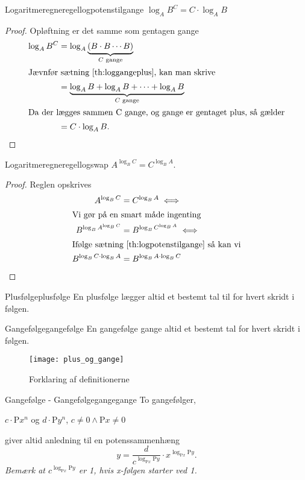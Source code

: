 \documentclass{article}
\newcommand{\Rho}{\mathrm{P}}
\begin{document}
\begin{theorem}{Logaritmeregneregel}{logpotenstilgange}
	$\log_AB^C = C \cdot \log_AB$
\end{theorem}

\begin{proof}
Opløftning er det samme som gentagen gange
\begin{align*}
	\log_AB^C &= \log_A{\underbrace{(B \cdot B \cdots B)}_{C\text{ gange}}}\\
\intertext{Jævnfør sætning \ref{th:loggangeplus}, kan man skrive}
			  &= \underbrace{\log_A{B} + \log_A{B} + \cdots + \log_A{B}}_{C\text{ gange}}\\
\intertext{Da der lægges sammen C gange, og gange er gentaget plus, så gælder}
			  &= C \cdot \log_AB.\qedhere
\end{align*}
\end{proof}

\begin{theorem}{Logaritmeregneregel}{logswap}
	$A^{\log_BC} = C^{\log_BA}$.
\end{theorem}

\begin{proof}
Reglen opskrives
\begin{align*}
	A^{\log_BC} &= C^{\log_BA} \iff\\
\intertext{Vi gør på en smart måde ingenting}
	B^{\log_B{A^{\log_BC}}} &= B^{\log_B{C^{\log_BA}}} \iff\\
\intertext{Ifølge sætning \ref{th:logpotenstilgange} så kan vi}
	B^{\log_BC \cdot \log_B{A}} &= B^{\log_BA \cdot \log_B{C}}\qedhere
\end{align*}
\end{proof}

\begin{definition}{Plusfølge}{plusfølge}
	En plusfølge lægger altid et bestemt tal til for hvert skridt i følgen.
\end{definition}

\begin{definition}{Gangefølge}{gangefølge}
	En gangefølge gange altid et bestemt tal for hvert skridt i følgen.
\end{definition}

\begin{figure}[H]
	\centering
	\caption{Forklaring af definitionerne}
	\texttt{[image: plus\_og\_gange]}
	\label{plus_og_gange}
\end{figure}

\begin{theorem}{Gangefølge - Gangefølge}{gangegange}
	To gangefølger,
	\begin{center}
		$c\cdot \Rho x^n$ og $d\cdot \Rho y^n$, $c \ne 0 \land \Rho x \ne 0$
	\end{center}
	giver altid anledning til en potenssammenhæng
	\[
		y = \frac{d}{c^{\log_{\Rho x}{\Rho y}}}\cdot x^{\log_{\Rho x}{\Rho y}}.
	\]
	\textit{Bemærk at $c^{\log_{\Rho x}{\Rho y}}$ er 1, hvis x-følgen starter ved 1.}
\end{theorem}
\end{document}
